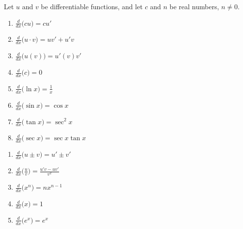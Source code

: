 {Let $u$ and $v$ be differentiable functions, and let $c$ and $n$ be real numbers, $n\neq 0$. \\
\begin{minipage}{.5\specialboxlength}
	\begin{enumerate}
	\item		$\frac{d}{dx}\big(cu\big) = cu'$
	\item		$\frac{d}{dx}\big(u\cdot v\big) = uv'+u'v$
	\item		$\frac{d}{dx}\big(u(v)\big) = u'(v)v'$
	\item		$\frac{d}{dx}\big(c\big) = 0$
	\item		$\frac{d}{dx}\big(\ln x\big) = \frac{1}{x}$
	\item		$\frac{d}{dx}\big(\sin x\big) = \cos x$
	\item		$\frac{d}{dx}\big(\tan x\big) = \sec^2x$
	\item		$\frac{d}{dx}\big(\sec x\big) = \sec x\tan x$
	\end{enumerate}
\end{minipage}%
\begin{minipage}{.5\specialboxlength}
	\begin{enumerate}
	\item		$\frac{d}{dx}\big(u\pm v\big) = u'\pm v'$
	\item		$\frac{d}{dx}\big(\frac uv\big) = \frac{u'v-uv'}{v^2}$
	\item		$\frac{d}{dx}\big(x^n\big) = nx^{n-1}$
	\item		$\frac{d}{dx}\big(x\big) = 1$
	\item		$\frac{d}{dx}\big(e^x\big) = e^x$

\end{enumerate}
\end{minipage}}
